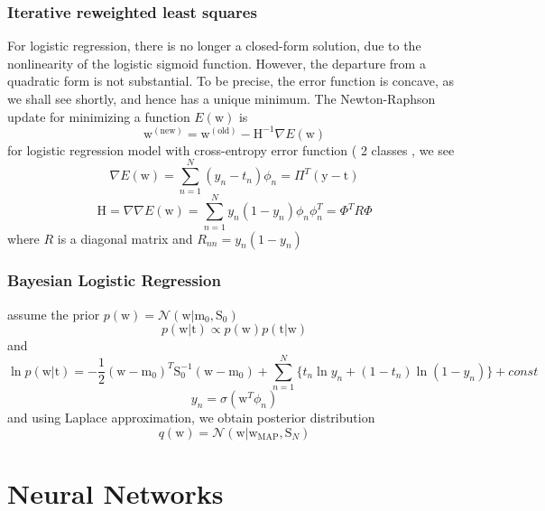 \documentclass[a4paper]{book}
\begin{document}
\subsubsection{Iterative reweighted least squares }
For logistic regression, there is no longer a closed-form solution, due to the nonlinearity of the logistic sigmoid function. However, the departure from a quadratic form is not substantial. To be precise, the error function is concave, as we shall see shortly, and hence has a unique minimum.\newline
The Newton-Raphson update for minimizing a function $E(\mathrm w)$ is
\begin{equation}
  \mathrm w^{(\mathrm {new})}=\mathrm w^{(\mathrm {old})}-\mathrm H^{-1}\nabla E(\mathrm w)
\end{equation}
for logistic regression model with cross-entropy error function ( 2 classes , we see
$$\nabla E(\mathrm w) = \sum_{n=1}^N(y_n-t_n)\phi_n = \Pi^T(\mathrm y-\mathrm t)$$
$$\mathrm H=\nabla\nabla E(\mathrm w) = \sum_{n=1}^Ny_n(1-y_n)\phi_n\phi_n^T = \Phi^TR\Phi$$
where $R$ is a diagonal matrix and $R_{nn} = y_n(1-y_n)$
\subsubsection{Bayesian Logistic Regression}
assume the prior $p(\mathrm w) = \mathcal N(\mathrm w|\mathrm m_0,\mathrm S_0)$
$$p(\mathrm w|\mathrm t) \propto p(\mathrm w)p(\mathrm t|\mathrm w)$$
and 
$$\ln p(\mathrm w|\mathrm t) = -\frac12(\mathrm w-\mathrm m_0)^T\mathrm S_0^{-1}(\mathrm w-\mathrm m_0)+\sum_{n=1}^N\{t_n\ln y_n +(1-t_n)\ln (1-y_n)\} + const$$
$$y_n = \sigma(\mathrm w^T\phi_n)$$
and using Laplace approximation, we obtain posterior distribution
$$q(\mathrm w) = \mathcal N(\mathrm w|\mathrm w_{\mathrm {MAP}}, \mathrm S_N)$$






\section{Neural Networks}
\end{document}
